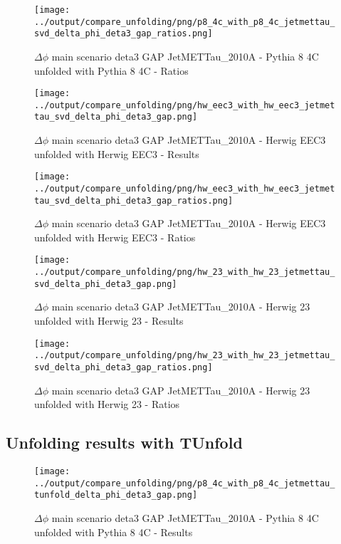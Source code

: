 \documentclass[11pt]{book}
\begin{document}
\begin{figure}[ht]
\centering
\texttt{[image: ../output/compare\_unfolding/png/p8\_4c\_with\_p8\_4c\_jetmettau\_svd\_delta\_phi\_deta3\_gap\_ratios.png]}
\caption{$\Delta\phi$ main scenario deta3 GAP JetMETTau\_2010A - Pythia 8 4C unfolded with Pythia 8 4C - Ratios}
\label{p8_p8_jetmettau_svd_delta_phi_deta3_gap_b}
\end{figure}

\begin{figure}[ht]
\centering
\texttt{[image: ../output/compare\_unfolding/png/hw\_eec3\_with\_hw\_eec3\_jetmettau\_svd\_delta\_phi\_deta3\_gap.png]}
\caption{$\Delta\phi$ main scenario deta3 GAP JetMETTau\_2010A - Herwig EEC3 unfolded with Herwig EEC3 - Results}
\label{hw_eec3_hw_eec3_jetmettau_svd_delta_phi_deta3_gap_a}
\end{figure}

\begin{figure}[ht]
\centering
\texttt{[image: ../output/compare\_unfolding/png/hw\_eec3\_with\_hw\_eec3\_jetmettau\_svd\_delta\_phi\_deta3\_gap\_ratios.png]}
\caption{$\Delta\phi$ main scenario deta3 GAP JetMETTau\_2010A - Herwig EEC3 unfolded with Herwig EEC3 - Ratios}
\label{hw_eec3_hw_eec3_jetmettau_svd_delta_phi_deta3_gap_b}
\end{figure}

\begin{figure}[ht]
\centering
\texttt{[image: ../output/compare\_unfolding/png/hw\_23\_with\_hw\_23\_jetmettau\_svd\_delta\_phi\_deta3\_gap.png]}
\caption{$\Delta\phi$ main scenario deta3 GAP JetMETTau\_2010A - Herwig 23 unfolded with Herwig 23 - Results}
\label{hw_23_hw_23_jetmettau_svd_delta_phi_deta3_gap_a}
\end{figure}

\begin{figure}[ht]
\centering
\texttt{[image: ../output/compare\_unfolding/png/hw\_23\_with\_hw\_23\_jetmettau\_svd\_delta\_phi\_deta3\_gap\_ratios.png]}
\caption{$\Delta\phi$ main scenario deta3 GAP JetMETTau\_2010A - Herwig 23 unfolded with Herwig 23 - Ratios}
\label{hw_23_hw_23_jetmettau_svd_delta_phi_deta3_gap_b}
\end{figure}


\clearpage
\subsection{Unfolding results with TUnfold}

\begin{figure}[ht]
\centering
\texttt{[image: ../output/compare\_unfolding/png/p8\_4c\_with\_p8\_4c\_jetmettau\_tunfold\_delta\_phi\_deta3\_gap.png]}
\caption{$\Delta\phi$ main scenario deta3 GAP JetMETTau\_2010A - Pythia 8 4C unfolded with Pythia 8 4C - Results}
\label{p8_p8_jetmettau_tunfold_delta_phi_deta3_gap_a}
\end{figure}
\end{document}
